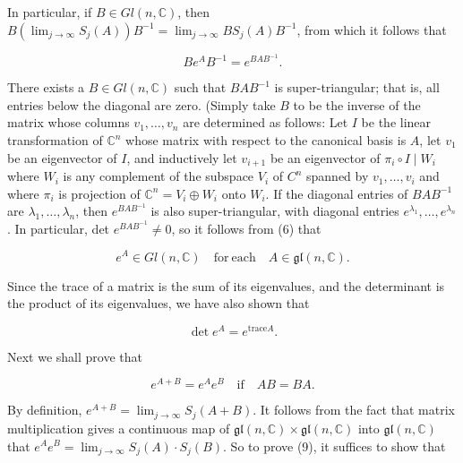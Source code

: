 \begin{examples}
In particular, if $B \in Gl(n, \mathbb{C})$, then $B\left(\lim_{j \to \infty} S_j(A)\right)B^{-1} = \lim_{j \to \infty} BS_j(A)B^{-1}$, from which it follows that

\begin{equation}
\tag{6}\label{eq:3.35:6}
Be^{A}B^{-1}=e^{BAB^{-1}}.
\end{equation}

There exists a $B\in Gl(n,\mathbb{C})$ such that $BAB^{-1}$ is super-triangular; that is, all entries below the diagonal are zero. (Simply take $B$ to be the inverse of the matrix whose columns $v_1,\ldots,v_n$ are determined as follows: Let $I$ be the linear transformation of $\mathbb{C}^n$ whose matrix with respect to the canonical basis is $A$, let $v_1$ be an eigenvector of $I$, and inductively let $v_{i+1}$ be an eigenvector of $\pi_i\circ I\mid W_i$ where $W_i$ is any complement of the subspace $V_i$ of $C^n$ spanned by $v_1,\ldots,v_i$ and where $\pi_i$ is projection of $\mathbb{C}^n=V_i\oplus W_i$ onto $W_i$. If the diagonal entries of $BAB^{-1}$ are $\lambda_1,\ldots,\lambda_n$, then $e^{BAB^{-1}}$ is also super-triangular, with diagonal entries $e^{\lambda_1},\ldots,e^{\lambda_n}$. In particular, det $e^{BAB^{-1}}\neq0$, so it follows from (6) that

\begin{equation}
\tag{7}\label{eq:3.35:7}
e^{A}\in Gl(n,\mathbb{C})\quad\mathrm{for~each}\quad A\in\mathfrak{gl}(n,\mathbb{C}).
\end{equation}

Since the trace of a matrix is the sum of its eigenvalues, and the determinant is the product of its eigenvalues, we have also shown that

\begin{equation}
\tag{8}\label{eq:3.35:8}
\det e^{A}=e^{\mathrm{trace}A}.
\end{equation}

Next we shall prove that

\begin{equation}
\tag{9}\label{eq:3.35:9}
e^{A+B}=e^{A}e^{B}\quad\mathrm{if}\quad A B=B A.
\end{equation}

By definition,  $ e^{A+B} = \lim_{j \to \infty} S_j(A + B) $. It follows from the fact that matrix multiplication gives a continuous map of  $ \mathfrak{gl}(n, \mathbb{C}) \times \mathfrak{gl}(n, \mathbb{C}) $ into  $ \mathfrak{gl}(n, \mathbb{C}) $ that  $ e^A e^B = \lim_{j \to \infty} S_j(A) \cdot S_j(B) $. So to prove (9), it suffices to show that


\end{examples}
